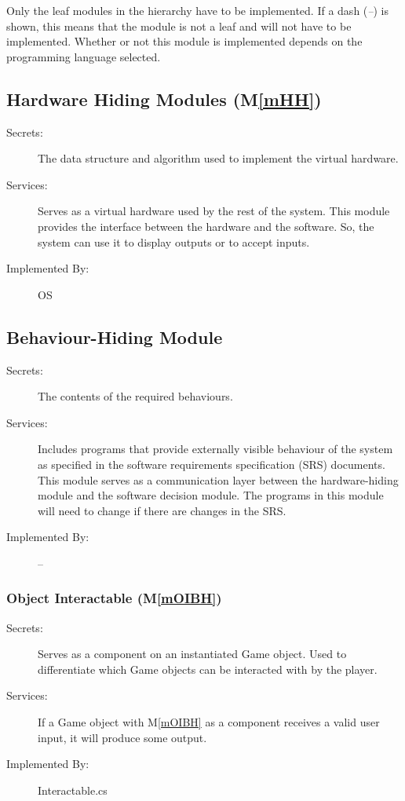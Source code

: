 \documentclass[12pt, titlepage]{article}
\newcommand{\mref}[1]{M\ref{#1}}
\begin{document}
Only the leaf modules in the
hierarchy have to be implemented. If a dash (\emph{--}) is shown, this means
that the module is not a leaf and will not have to be implemented. Whether or
not this module is implemented depends on the programming language
selected.

\subsection{Hardware Hiding Modules (\mref{mHH})}

\begin{description}
\item[Secrets:]The data structure and algorithm used to implement the virtual
  hardware.
\item[Services:]Serves as a virtual hardware used by the rest of the
  system. This module provides the interface between the hardware and the
  software. So, the system can use it to display outputs or to accept inputs.
\item[Implemented By:] OS
\end{description}

\subsection{Behaviour-Hiding Module}

\begin{description}
\item[Secrets:]The contents of the required behaviours.
\item[Services:]Includes programs that provide externally visible behaviour of
  the system as specified in the software requirements specification (SRS)
  documents. This module serves as a communication layer between the
  hardware-hiding module and the software decision module. The programs in this
  module will need to change if there are changes in the SRS.
\item[Implemented By:] --
\end{description}

\subsubsection{Object Interactable (\mref{mOIBH})}

\begin{description}
\item[Secrets:] Serves as a component on an instantiated Game object. Used to differentiate which Game objects can be interacted with by the player.
\item[Services:] If a Game object with \mref{mOIBH} as a component receives a valid user input, it will produce some output. 
\item[Implemented By:] Interactable.cs
\end{description}
\end{document}
